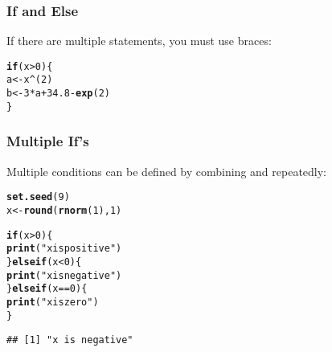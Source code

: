 \documentclass[12pt]{beamer}\usepackage[]{graphicx}\usepackage[]{color}
\makeatletter
\newcommand{\hlnum}[1]{\textcolor[rgb]{0.686,0.059,0.569}{#1}}%
\newcommand{\hlstr}[1]{\textcolor[rgb]{0.192,0.494,0.8}{#1}}%
\newcommand{\hlopt}[1]{\textcolor[rgb]{0,0,0}{#1}}%
\newcommand{\hlstd}[1]{\textcolor[rgb]{0.345,0.345,0.345}{#1}}%
\newcommand{\hlkwa}[1]{\textcolor[rgb]{0.161,0.373,0.58}{\textbf{#1}}}%
\newcommand{\hlkwb}[1]{\textcolor[rgb]{0.69,0.353,0.396}{#1}}%
\newcommand{\hlkwd}[1]{\textcolor[rgb]{0.737,0.353,0.396}{\textbf{#1}}}%
\newenvironment{kframe}{%
 \def\at@end@of@kframe{}%
 \ifinner\ifhmode%
  \def\at@end@of@kframe{\end{minipage}}%
  \begin{minipage}{\columnwidth}%
 \fi\fi%
 \def\FrameCommand##1{\hskip\@totalleftmargin \hskip-\fboxsep
 \colorbox{shadecolor}{##1}\hskip-\fboxsep
     \hskip-\linewidth \hskip-\@totalleftmargin \hskip\columnwidth}%
 \MakeFramed {\advance\hsize-\width
   \@totalleftmargin\z@ \linewidth\hsize
   \@setminipage}}%
 {\par\unskip\endMakeFramed%
 \at@end@of@kframe}
\newenvironment{knitrout}{}{} %
\makeatother
\begin{document}

\begin{frame}[fragile]
\frametitle{If and Else}

If there are multiple statements, you must use braces:
\begin{knitrout}\footnotesize
{}\color{fgcolor}\begin{kframe}
\begin{alltt}
\hlkwa{if} \hlstd{(x} \hlopt{>} \hlnum{0}\hlstd{) \{}
  \hlstd{a} \hlkwb{<-} \hlstd{x}\hlopt{^}\hlstd{(}\hlnum{2}\hlstd{)}
  \hlstd{b} \hlkwb{<-} \hlnum{3} \hlopt{*} \hlstd{a} \hlopt{+} \hlnum{34.8} \hlopt{-} \hlkwd{exp}\hlstd{(}\hlnum{2}\hlstd{)}
\hlstd{\}}
\end{alltt}
\end{kframe}
\end{knitrout}

\end{frame}


\begin{frame}[fragile]
\frametitle{Multiple If's}

Multiple conditions can be defined by combining  and  repeatedly:
\begin{knitrout}\footnotesize
{}\color{fgcolor}\begin{kframe}
\begin{alltt}
\hlkwd{set.seed}\hlstd{(}\hlnum{9}\hlstd{)}
\hlstd{x} \hlkwb{<-} \hlkwd{round}\hlstd{(}\hlkwd{rnorm}\hlstd{(}\hlnum{1}\hlstd{),} \hlnum{1}\hlstd{)}

\hlkwa{if} \hlstd{(x} \hlopt{>} \hlnum{0}\hlstd{) \{}
  \hlkwd{print}\hlstd{(}\hlstr{"x is positive"}\hlstd{)}
\hlstd{\}} \hlkwa{else if} \hlstd{(x} \hlopt{<} \hlnum{0}\hlstd{) \{}
  \hlkwd{print}\hlstd{(}\hlstr{"x is negative"}\hlstd{)}
\hlstd{\}} \hlkwa{else if} \hlstd{(x} \hlopt{==} \hlnum{0}\hlstd{) \{}
  \hlkwd{print}\hlstd{(}\hlstr{"x is zero"}\hlstd{)}
\hlstd{\}}
\end{alltt}
\begin{verbatim}
## [1] "x is negative"
\end{verbatim}
\end{kframe}
\end{knitrout}

\end{frame}
\end{document}
